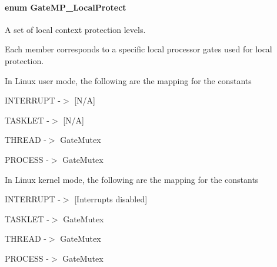\paragraph[{Gate\-M\-P\-\_\-\-Local\-Protect}]{\setlength{\rightskip}{0pt plus 5cm}enum {\bf Gate\-M\-P\-\_\-\-Local\-Protect}}\label{_gate_m_p_8h_a3877bd64627d7449d3687e8b06939652}


A set of local context protection levels. 

Each member corresponds to a specific local processor gates used for local protection.

In Linux user mode, the following are the mapping for the constants
\begin{DoxyItemize}
\item I\-N\-T\-E\-R\-R\-U\-P\-T -\/$>$ \mbox{[}N/\-A\mbox{]}
\item T\-A\-S\-K\-L\-E\-T -\/$>$ \mbox{[}N/\-A\mbox{]}
\item T\-H\-R\-E\-A\-D -\/$>$ Gate\-Mutex
\item P\-R\-O\-C\-E\-S\-S -\/$>$ Gate\-Mutex
\end{DoxyItemize}

In Linux kernel mode, the following are the mapping for the constants
\begin{DoxyItemize}
\item I\-N\-T\-E\-R\-R\-U\-P\-T -\/$>$ \mbox{[}Interrupts disabled\mbox{]}
\item T\-A\-S\-K\-L\-E\-T -\/$>$ Gate\-Mutex
\item T\-H\-R\-E\-A\-D -\/$>$ Gate\-Mutex
\item P\-R\-O\-C\-E\-S\-S -\/$>$ Gate\-Mutex
\end{DoxyItemize}


